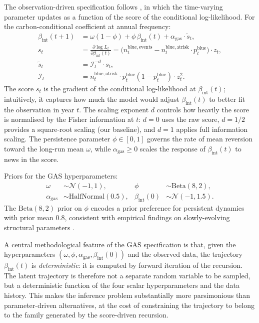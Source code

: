 \documentclass[11pt,a4paper]{article}
\newcommand{\bint}{\beta_{\mathrm{int}}}
\begin{document}
The observation-driven specification follows \citet{creal2008general, creal2013generalized}, in which the time-varying parameter updates as a function of the score of the conditional log-likelihood. For the carbon-conditional coefficient at annual frequency:
\begin{align}
\bint(t+1) &= \omega (1 - \phi) + \phi \, \bint(t) + \alpha_{\mathrm{gas}} \cdot \tilde{s}_t, \\
s_t &= \frac{\partial \log L_t}{\partial \bint(t)} = \big(n_t^{\mathrm{blue,events}} - n_t^{\mathrm{blue,atrisk}} \cdot p_t^{\mathrm{blue}}\big) \cdot z_t, \\
\tilde{s}_t &= \mathcal{I}_t^{-d} \cdot s_t, \\
\mathcal{I}_t &= n_t^{\mathrm{blue,atrisk}} \cdot p_t^{\mathrm{blue}} (1 - p_t^{\mathrm{blue}}) \cdot z_t^2.
\end{align}
The score $s_t$ is the gradient of the conditional log-likelihood at $\bint(t)$; intuitively, it captures how much the model would adjust $\bint(t)$ to better fit the observation in year $t$. The scaling exponent $d$ controls how heavily the score is normalised by the Fisher information at $t$: $d=0$ uses the raw score, $d=1/2$ provides a square-root scaling (our baseline), and $d=1$ applies full information scaling. The persistence parameter $\phi \in [0,1]$ governs the rate of mean reversion toward the long-run mean $\omega$, while $\alpha_{\mathrm{gas}} \geq 0$ scales the response of $\bint(t)$ to news in the score.

Priors for the GAS hyperparameters:
\begin{align}
\omega &\sim \mathcal{N}(-1, 1), &
\phi &\sim \mathrm{Beta}(8, 2), \\
\alpha_{\mathrm{gas}} &\sim \mathrm{HalfNormal}(0.5), &
\bint(0) &\sim \mathcal{N}(-1, 1.5).
\end{align}
The $\mathrm{Beta}(8,2)$ prior on $\phi$ encodes a prior preference for persistent dynamics with prior mean $0.8$, consistent with empirical findings on slowly-evolving structural parameters \citep{creal2013generalized}.

A central methodological feature of the GAS specification is that, given the hyperparameters $(\omega, \phi, \alpha_{\mathrm{gas}}, \bint(0))$ and the observed data, the trajectory $\bint(t)$ is \textit{deterministic}: it is computed by forward iteration of the recursion. The latent trajectory is therefore not a separate random variable to be sampled, but a deterministic function of the four scalar hyperparameters and the data history. This makes the inference problem substantially more parsimonious than parameter-driven alternatives, at the cost of constraining the trajectory to belong to the family generated by the score-driven recursion.
\end{document}
